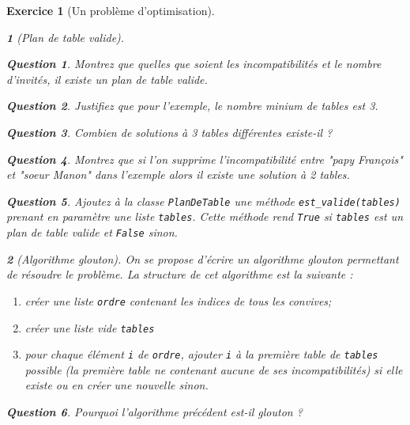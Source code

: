 \documentclass{article}
\theoremstyle{exostyle}
\newtheorem{exo}{Exercice}
\theoremstyle{partiestyle}
\newtheorem{partie}{}[exo]
\theoremstyle{questionstyle}
\newtheorem{questionpartie}{Question}[partie]
\begin{document}
\begin{exo}[Un problème d'optimisation]
\begin{partie}[Plan de table valide]
\begin{questionpartie} 
Montrez que quelles que soient les incompatibilités et le nombre d'invités, il existe un plan de table valide.
\end{questionpartie}

\begin{questionpartie} 
Justifiez que pour l'exemple, le nombre minium de tables est 3.
\end{questionpartie}

\begin{questionpartie} 
Combien de solutions à 3 tables différentes existe-il ?
\end{questionpartie}

\begin{questionpartie} 
Montrez que si l'on supprime l'incompatibilité entre {\it "papy François"} et {\it "soeur Manon"} dans l'exemple alors il existe une solution à 2 tables.
\end{questionpartie}

\begin{questionpartie}
Ajoutez à la classe \verb+PlanDeTable+ une méthode \verb|est_valide(tables)| prenant en paramètre une liste \verb|tables|. Cette méthode rend \verb|True| si \verb|tables| est un plan de table valide et \verb|False| sinon.
\end{questionpartie}

\end{partie}

\begin{partie}[Algorithme glouton]

On se propose d'écrire un algorithme glouton permettant de résoudre le problème. La structure de cet algorithme est la suivante :

\begin{enumerate}
\item créer une liste \verb|ordre| contenant les indices de tous les convives;
\item créer une liste vide \verb|tables|
\item pour chaque élément \verb|i| de \verb|ordre|, ajouter \verb|i| à la première table de \verb|tables| possible (la première table ne contenant aucune de ses incompatibilités) si elle existe ou en créer une nouvelle sinon.
\end{enumerate}

\begin{questionpartie}   
Pourquoi l'algorithme précédent est-il glouton ?
\end{questionpartie}


\end{partie}
\end{exo}
\end{document}
